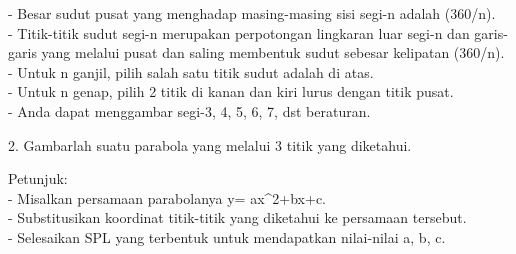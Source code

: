 \documentclass[a4paper,10pt]{article}
\begin{document}
\begin{eulernotebook}
\begin{eulercomment}
\begin{eulercomment}
\begin{eulercomment}
\begin{eulercomment}
\begin{eulercomment}
\begin{eulercomment}
\begin{eulercomment}
\begin{eulercomment}
\begin{eulercomment}
\begin{eulercomment}
\begin{eulercomment}
\begin{eulercomment}
\begin{eulercomment}
\begin{eulercomment}
\begin{eulercomment}
\begin{eulercomment}
\begin{eulercomment}
\begin{eulercomment}
\begin{eulercomment}
\begin{eulercomment}
\begin{eulercomment}
\begin{eulercomment}
\begin{eulercomment}
\begin{eulercomment}
\begin{eulercomment}
\begin{eulercomment}
\begin{eulercomment}
\begin{eulercomment}
\begin{eulercomment}
\begin{eulercomment}
\begin{eulercomment}
\begin{eulercomment}
\begin{eulercomment}
\begin{eulercomment}
\begin{eulercomment}
- Besar sudut pusat yang menghadap masing-masing sisi segi-n adalah (360/n).\\
- Titik-titik sudut segi-n merupakan perpotongan lingkaran luar segi-n dan garis-garis yang
melalui pusat dan saling membentuk sudut sebesar kelipatan (360/n).\\
- Untuk n ganjil, pilih salah satu titik sudut adalah di atas.\\
- Untuk n genap, pilih 2 titik di kanan dan kiri lurus dengan titik pusat.\\
- Anda dapat menggambar segi-3, 4, 5, 6, 7, dst beraturan.

2. Gambarlah suatu parabola yang melalui 3 titik yang diketahui.

Petunjuk:\\
- Misalkan persamaan parabolanya y= ax\textasciicircum{}2+bx+c.\\
- Substitusikan koordinat titik-titik yang diketahui ke persamaan tersebut.\\
- Selesaikan SPL yang terbentuk untuk mendapatkan nilai-nilai a, b, c.


\end{eulercomment}
\end{eulercomment}
\end{eulercomment}
\end{eulercomment}
\end{eulercomment}
\end{eulercomment}
\end{eulercomment}
\end{eulercomment}
\end{eulercomment}
\end{eulercomment}
\end{eulercomment}
\end{eulercomment}
\end{eulercomment}
\end{eulercomment}
\end{eulercomment}
\end{eulercomment}
\end{eulercomment}
\end{eulercomment}
\end{eulercomment}
\end{eulercomment}
\end{eulercomment}
\end{eulercomment}
\end{eulercomment}
\end{eulercomment}
\end{eulercomment}
\end{eulercomment}
\end{eulercomment}
\end{eulercomment}
\end{eulercomment}
\end{eulercomment}
\end{eulercomment}
\end{eulercomment}
\end{eulercomment}
\end{eulercomment}
\end{eulercomment}
\end{eulernotebook}
\end{document}
